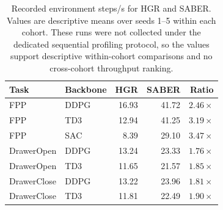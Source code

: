 \begin{table}[t]
\centering
\small
\setlength{\tabcolsep}{3.5pt}
\begin{tabular}{llrrr}
\toprule
Task & Backbone & HGR & SABER & Ratio \\
\midrule
FPP & DDPG & 16.93 & 41.72 & \(2.46\times\) \\
FPP & TD3 & 12.94 & 41.25 & \(3.19\times\) \\
FPP & SAC & 8.39 & 29.10 & \(3.47\times\) \\
DrawerOpen & DDPG & 13.24 & 23.33 & \(1.76\times\) \\
DrawerOpen & TD3 & 11.65 & 21.57 & \(1.85\times\) \\
DrawerClose & DDPG & 13.22 & 23.96 & \(1.81\times\) \\
DrawerClose & TD3 & 11.81 & 22.49 & \(1.90\times\) \\
\bottomrule
\end{tabular}
\caption{Recorded environment steps/s for HGR and SABER. Values are
descriptive means over seeds 1--5 within each cohort. These runs were not
collected under the dedicated sequential profiling protocol, so the values
support descriptive within-cohort comparisons and no cross-cohort throughput ranking.}
\label{tab:supp-hgr-throughput}
\end{table}
